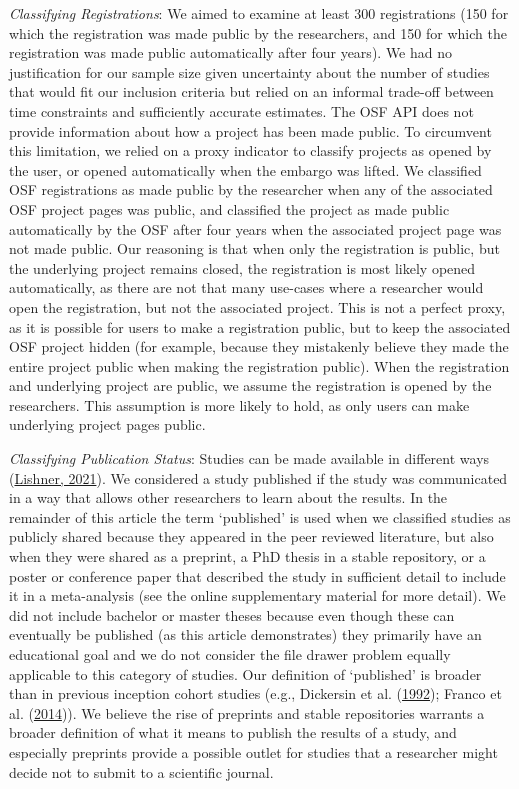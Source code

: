 \documentclass[
  ,jou, a4paper,floatsintext]{apa6}
\begin{document}
\emph{Classifying Registrations}: We aimed to examine at least 300 registrations (150 for which the registration was made public by the researchers, and 150 for which the registration was made public automatically after four years). We had no justification for our sample size given uncertainty about the number of studies that would fit our inclusion criteria but relied on an informal trade-off between time constraints and sufficiently accurate estimates. The OSF API does not provide information about how a project has been made public. To circumvent this limitation, we relied on a proxy indicator to classify projects as opened by the user, or opened automatically when the embargo was lifted. We classified OSF registrations as made public by the researcher when any of the associated OSF project pages was public, and classified the project as made public automatically by the OSF after four years when the associated project page was not made public. Our reasoning is that when only the registration is public, but the underlying project remains closed, the registration is most likely opened automatically, as there are not that many use-cases where a researcher would open the registration, but not the associated project. This is not a perfect proxy, as it is possible for users to make a registration public, but to keep the associated OSF project hidden (for example, because they mistakenly believe they made the entire project public when making the registration public). When the registration and underlying project are public, we assume the registration is opened by the researchers. This assumption is more likely to hold, as only users can make underlying project pages public.

\emph{Classifying Publication Status}: Studies can be made available in different ways (\protect\hyperlink{ref-lishner_sorting_2021}{Lishner, 2021}). We considered a study published if the study was communicated in a way that allows other researchers to learn about the results. In the remainder of this article the term `published' is used when we classified studies as publicly shared because they appeared in the peer reviewed literature, but also when they were shared as a preprint, a PhD thesis in a stable repository, or a poster or conference paper that described the study in sufficient detail to include it in a meta-analysis (see the online supplementary material for more detail). We did not include bachelor or master theses because even though these can eventually be published (as this article demonstrates) they primarily have an educational goal and we do not consider the file drawer problem equally applicable to this category of studies. Our definition of `published' is broader than in previous inception cohort studies (e.g., Dickersin et al. (\protect\hyperlink{ref-dickersin_factors_1992}{1992}); Franco et al. (\protect\hyperlink{ref-franco_publication_2014}{2014})). We believe the rise of preprints and stable repositories warrants a broader definition of what it means to publish the results of a study, and especially preprints provide a possible outlet for studies that a researcher might decide not to submit to a scientific journal.
\end{document}
